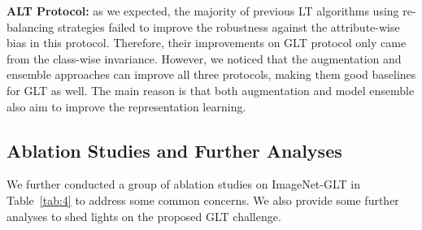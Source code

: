 \documentclass{article}
\begin{document}
\noindent\textbf{ALT Protocol:} as we expected, the majority of previous LT algorithms using re-balancing strategies failed to improve the robustness against the attribute-wise bias in this protocol. Therefore, their improvements on GLT protocol only came from the class-wise invariance. However, we noticed that the augmentation and ensemble approaches can improve all three protocols, making them good baselines for GLT as well. The main reason is that both augmentation and model ensemble also aim to improve the representation learning. 






\subsection{Ablation Studies and Further Analyses}
\label{sec:5.5}

We further conducted a group of ablation studies on ImageNet-GLT in Table~\ref{tab:4} to address some common concerns. We also provide some further analyses to shed lights on the proposed GLT challenge.
\end{document}
